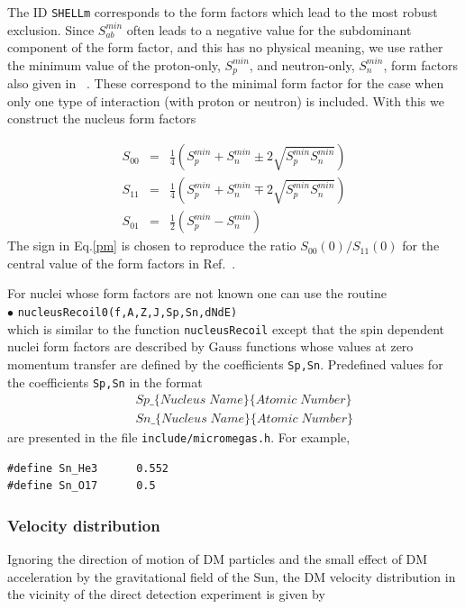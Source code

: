 \documentclass[12pt,a4paper]{article}
\begin{document}
The ID {\tt SHELLm} corresponds to the form factors which lead to the most robust exclusion.  
Since  $S_{ab}^{min}$ often leads to a negative value for the subdominant component of the form factor, and this has no physical meaning, we use rather  
the minimum value of  the proton-only, $S_p^{min}$,   and neutron-only, $S_n^{min}$,  form factors also given in ~\cite{Klos:2013rwa}. 
These  correspond to the minimal form factor for the case when only one type of interaction (with proton or neutron) is included. With this we construct  
the nucleus form factors 

\begin{eqnarray}
\label{pm}
  S_{00}&=& \frac{1}{4} \left(S_p^{min} +S_n^{min} \pm 2 \sqrt{S_p^{min} S_n^{min}}\right)\\
\nonumber
  S_{11}&=& \frac{1}{4}  \left(S_p^{min} +S_n^{min} \mp 2 \sqrt{S_p^{min} S_n^{min}}\right)\\
\nonumber
  S_{01}&=& \frac{1}{2}  (S_p^{min}-S_n^{min}) 
\end{eqnarray} 
The sign in Eq.\ref{pm} is chosen  to reproduce the  ratio $S_{00}(0)/{S}_{11}(0)$ for the central value of the form factors in Ref.~\cite{Klos:2013rwa}.

For nuclei whose form factors  are not known one can use the routine \\
\noindent
$\bullet$ \verb|nucleusRecoil0(f,A,Z,J,Sp,Sn,dNdE)|\\
which is similar to the  function \verb|nucleusRecoil| except that 
the spin dependent nuclei form factors are described by Gauss functions \cite{Belanger:2008sj}
whose values  at zero momentum transfer are defined by the coefficients \verb|Sp,Sn|. 
Predefined values for the coefficients \verb|Sp,Sn| in the format
\begin{eqnarray}
    &&Sp\_\{Nucleus\; Name\}\{Atomic \;Number\} \nonumber\\
    &&Sn\_\{Nucleus\; Name\}\{Atomic\; Number\} \nonumber
\end{eqnarray}
 are presented in the file  \verb|include/micromegas.h|. For example, 
\begin{verbatim}
#define Sn_He3      0.552
#define Sn_O17      0.5
\end{verbatim}

\subsubsection{Velocity distribution}

Ignoring the  direction of motion of DM particles and  the small effect of DM acceleration by the gravitational field of the Sun,
the DM velocity distribution in the vicinity  of the direct detection experiment is given by
 
\end{document}
